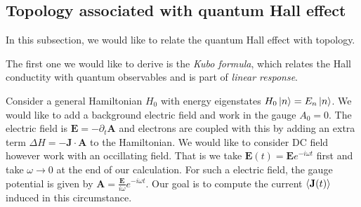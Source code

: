 \documentclass[12pt,a4paper]{article}
\numberwithin{equation}{section}
\begin{document}
\subsection{Topology associated with quantum Hall effect}
In this subsection, we would like to relate the quantum Hall effect with topology.

The first one we would like to derive is the \textit{Kubo formula}, which relates the Hall conductity with quantum observables and is part of \textit{linear response}.

Consider a general Hamiltonian $H_0$ with energy eigenstates $H_0\ket{n} = E_n\ket{n}$. We would like to add a background electric field and work in the gauge $A_0=0$.
The electric field is $\mathbf{E} = -\partial_t \mathbf{A}$ and electrons are coupled with this by adding an extra term $\Delta H = -\mathbf{J}\cdot\mathbf{A}$ to the 
Hamiltonian. We would like to consider DC field however work with an occillating field. That is we take $\mathbf{E}(t) = \mathbf{E} e^{-i\omega t}$ first and take $\omega\to 0$
at the end of our calculation. For such a electric field, the gauge potential is given by $\mathbf{A} = \frac{\mathbf{E}}{i\omega}e^{-i\omega t}$. Our goal is to compute the 
current $\expval{\mathbf{J}(t)}$ induced in this circumstance.
\end{document}
